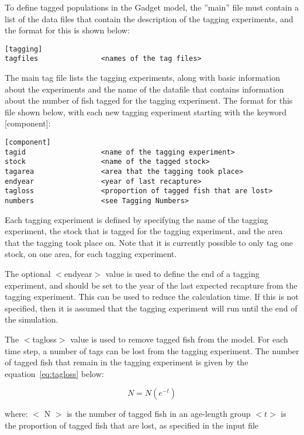\documentclass[10pt,twoside]{book}
\begin{document}
\bigskip
To define tagged populations in the Gadget model, the ''main'' file must contain a list of the data files that contain the description of the tagging experiments, and the format for this is shown below:

{\small\begin{verbatim}
[tagging]
tagfiles               <names of the tag files>
\end{verbatim}}

The main tag file lists the tagging experiments, along with basic information about the experiments and the name of the datafile that contains information about the number of fish tagged for the tagging experiment.  The format for this file shown below, with each new tagging experiment starting with the keyword [component]:

{\small\begin{verbatim}
[component]
tagid                  <name of the tagging experiment>
stock                  <name of the tagged stock>
tagarea                <area that the tagging took place>
endyear                <year of last recapture>
tagloss                <proportion of tagged fish that are lost>
numbers                <see Tagging Numbers>
\end{verbatim}}

Each tagging experiment is defined by specifying the name of the tagging experiment, the stock that is tagged for the tagging experiment, and the area that the tagging took place on.  Note that it is currently possible to only tag one stock, on one area, for each tagging experiment.

\bigskip
The optional $<$endyear$>$ value is used to define the end of a tagging experiment, and should be set to the year of the last expected recapture from the tagging experiment.  This can be used to reduce the calculation time.  If this is not specified, then it is assumed that the tagging experiment will run until the end of the simulation.

\bigskip
The $<$tagloss$>$ value is used to remove tagged fish from the model.  For each time step, a number of tags can be lost from the tagging experiment.  The number of tagged fish that remain in the tagging experiment is given by the equation~\ref{eq:tagloss} below:

\begin{equation}\label{eq:tagloss}
N = N (e^{-t})
\end{equation}

where:\newline
$<$ N $>$ is the number of tagged fish in an age-length group\newline
$<t>$ is the proportion of tagged fish that are lost, as specified in the input file
\end{document}
